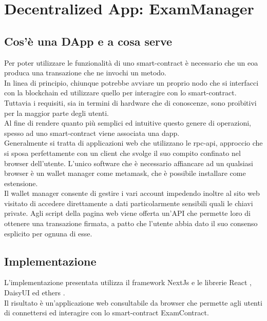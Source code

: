 \section{Decentralized App: ExamManager}

\subsection{Cos'è una DApp e a cosa serve}

Per poter utilizzare le funzionalità di uno \gls{smart-contract} è necessario che un \gls{eoa} produca una transazione che ne invochi un metodo. \\
In linea di principio, chiunque potrebbe avviare un proprio nodo che si interfacci con la blockchain ed utilizzare quello per interagire con lo \gls{smart-contract}.
Tuttavia i requisiti, sia in termini di hardware che di conoscenze, sono proibitivi per la maggior parte degli utenti. \\
Al fine di rendere quanto più semplici ed intuitive questo genere di operazioni, spesso ad uno \gls{smart-contract} viene associata una \gls{dapp}. \\
Generalmente si tratta di applicazioni web che utilizzano le \gls{rpc-api},
approccio che si sposa perfettamente con un client che svolge il suo compito confinato nel browser dell'utente.
L'unico software che è necessario affiancare ad un qualsiasi browser è un wallet manager come \gls{metamask}, che è possibile installare come estensione. \\
Il wallet manager consente di gestire i vari account impedendo inoltre al sito web visitato di accedere direttamente a dati particolarmente sensibili quali le chiavi private.
Agli script della pagina web viene offerta un'API che permette loro di ottenere una transazione firmata, a patto che l'utente abbia dato il suo consenso esplicito per ognuna di esse.

\subsection{Implementazione}

L'implementazione presentata utilizza il framework NextJs \cite{soft:nextjs} e le librerie React \cite{soft:react}, DaisyUI \cite{soft:daisyui} ed ethers \cite{soft:ethers}. \\
Il risultato è un'applicazione web consultabile da browser che permette agli utenti di connettersi ed interagire con lo \gls{smart-contract} ExamContract.

